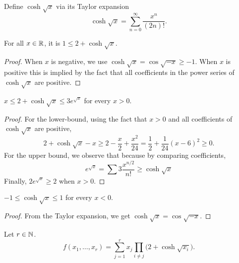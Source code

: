 \begin{definition}
  \label{def:coshsqrt}
  \leanok
  Define $\cosh \sqrt{x}$ via its Taylor expansion
  $$\cosh\sqrt{x} = \sum_{n = 0}^\infty \frac{x^n}{(2n)!}.$$
\end{definition}

\begin{lemma}
  \label{lem:le-coshsqrt}
  \leanok
  For all $x \in \mathbb{R}$, it is $1 \le 2 + \cosh\sqrt{x}$.
\end{lemma}
\begin{proof}
  When $x$ is negative, we use $\cosh \sqrt{x} = \cos \sqrt{-x}\ge -1$. When $x$ is positive this is implied by the fact that all coefficients in the power series of $\cosh \sqrt{x}$ are positive.
\end{proof}

\begin{lemma}
  \label{lem:coshsqrt-bd-pos}
  \leanok
  $x \le 2 + \cosh \sqrt{x} \le 3 e^{\sqrt{x}}$ for every $x > 0$.
\end{lemma}
\begin{proof}
  For the lower-bound, using the fact that $x>0$ and all coefficients of $\cosh \sqrt{x}$ are positive,
  \begin{equation*}
    2+\cosh \sqrt{x} - x \ge 2 - \frac{x}{2} + \frac{x^2}{24} = \frac{1}{2}+\frac{1}{24}(x-6)^2 \ge 0.
\end{equation*}
For the upper bound, we observe that because by comparing coefficients,
\begin{equation*}
  e^{\sqrt{x}} = \sum 3\frac{x^{n/2}}{n!}  \ge \cosh\sqrt{x}
\end{equation*}
Finally, $2e^{\sqrt{x}}\ge 2$ when $x>0$.
\end{proof}

\begin{lemma}
  \label{lem:coshsqrt-bd-neg}
  \leanok
  $-1 \le \cosh \sqrt{x} \le 1$ for every $x < 0$.
\end{lemma}
\begin{proof}
  From the Taylor expansion, we get $\cosh \sqrt{x} = \cos \sqrt{-x}$.
\end{proof}

\begin{definition}
  \label{def:f}
  \leanok
  Let $r \in \mathbb{N}$.
  \begin{equation}\label{eq:f}
    f(x_1,\dots,x_r) = \sum_{j = 1}^r x_j \prod_{i \ne j} \big( 2 + \cosh\sqrt{x_i} \big).
  \end{equation}
\end{definition}

